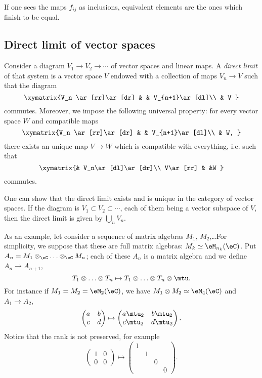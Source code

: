 If one sees the maps $f_{ij}$ as inclusions, equivalent elements are the ones which finish to be equal.

\subsection{Direct limit of vector spaces}

Consider a diagram $V_1\to V_2\to\cdots$ of vector spaces and linear maps. A \emph{direct limit} of that system is a vector space $V$ endowed with a collection of maps $V_n\to V$ such that the diagram 
\[ 
  \xymatrix{%
   V_n \ar[rr]\ar[dr]		&		&	V_{n+1}\ar[dl]\\
				& V
}
\]
commutes. Moreover, we impose the following universal property: for every vector space $W$ and compatible maps
\[ 
  \xymatrix{%
   V_n \ar[rr]\ar[dr]		&		&	V_{n+1}\ar[dl]\\
				& W,
}
\]
there exists an unique map $V\to W$ which is compatible with everything, i.e. such that
\[ 
  \xymatrix{%
		& V_n\ar[dl]\ar[dr]\\
   V\ar[rr]		&			&W
}
\]
commutes. 

One can show that the direct limit exists and is unique in the category of vector spaces. If the diagram is $V_1\subset V_2\subset \cdots$, each of them being a vector subspace of $V$, then the direct limit is given by $\bigcup_nV_n$.

As an example\label{PgExDirectLimVS}, let consider a sequence of matrix algebras $M_1$, $M_2$,\ldots For simplicity, we suppose that these are full matrix algebras: $M_k\simeq \eM_{n_k}(\eC)$. Put $A_n=M_1\otimes_{\eC}\ldots\otimes_{\eC} M_n$; each of these $A_n$ is a matrix algebra and we define $A_n\to A_{n+1}$,
\[ 
  T_1\otimes\ldots\otimes T_n\mapsto T_1\otimes\ldots\otimes T_n\otimes\mtu.
\]
For instance if $M_1=M_2=\eM_2(\eC)$, we have $M_1\otimes M_2\simeq\eM_4(\eC)$ and $A_1\to A_2$,
\[ 
  \begin{pmatrix}
a&b\\
c&d
\end{pmatrix}
\mapsto
\begin{pmatrix}
a\mtu_2 & b\mtu_2\\
c\mtu_2 & d\mtu_2
\end{pmatrix}.
\]
Notice that the rank is not preserved, for example
\[ 
  \begin{pmatrix}
1&0\\
0&0
\end{pmatrix}
\mapsto
\begin{pmatrix}
1 \\
&1\\
&&0\\
&&&0
\end{pmatrix}.
\]

